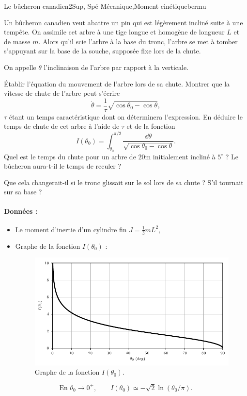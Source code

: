 
\begin{exercise}{Le bûcheron canadien}{2}{Sup, Spé}
{Mécanique,Moment cinétique}{bermu}

Un bûcheron canadien veut abattre un pin qui est légèrement incliné suite à une tempête. On assimile cet arbre à une tige longue et homogène de longueur $L$ et de masse $m$. Alors qu'il scie l'arbre à la base du tronc, l'arbre se met à tomber s'appuyant sur la base de la souche, supposée fixe lors de la chute.

On appelle $\theta$ l'inclinaison de l'arbre par rapport à la verticale.

\begin{questions}
    \question \'Etablir l'équation du mouvement de l'arbre lors de sa chute.
    \question Montrer que la vitesse de chute de l'arbre peut s'écrire
    $$\dot{\theta} = \dfrac{1}{\tau}\sqrt{\cos\theta_0 - \cos\theta},$$
    $\tau$ étant un temps caractéristique dont on déterminera l'expression.
    \question En déduire le temps de chute de cet arbre à l'aide de $\tau$ et de la fonction
    $$I(\theta_0) = \int_{\theta_0}^{\pi/2}\dfrac{\dd{\theta}}{\sqrt{\cos\theta_0 - \cos\theta}}.$$
    Quel est le temps du chute pour un arbre de 20m initialement incliné à $5^\circ$ ? Le bûcheron aura-t-il le temps de reculer ?
\end{questions}

\plusloin
Que cela changerait-il si le tronc glissait sur le sol lors de sa chute ? S'il tournait sur sa base ?

\paragraph{Données :}
\begin{itemize}
    \item Le moment d'inertie d'un cylindre fin $J = \frac{1}{3}mL^2$,
    \item Graphe de la fonction $I(\theta_0)$ :
        \begin{figure}[H]
            \centering
            \includegraphics[scale=1]{meca/fonction_I.pdf}
            \vspace{-1em}
            \caption{Graphe de la fonction $I(\theta_0)$.}
        \end{figure}
\end{itemize}

$$\text{En }\theta_0 \rightarrow 0^+, \qquad I(\theta_0) \simeq - \sqrt{2}\ln(\theta_0/\pi).$$
\end{exercise}